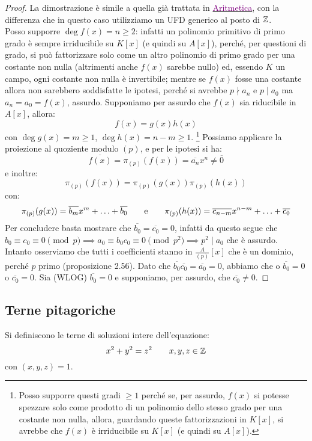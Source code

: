 \documentclass[11pt]{scrartcl}
\begin{document}
\begin{proof}
    La dimostrazione è simile a quella già trattata in \href{https://github.com/diego-unipi/Appunti-Aritmetica}{\textcolor{purple}{Aritmetica}}, 
    con la differenza che in questo caso utilizziamo un UFD generico al posto di $\mathbb Z$. \\
    Posso supporre $\deg f(x) = n \geq 2$: infatti un polinomio primitivo di primo grado è sempre irriducibile su $K[x]$ (e quindi su $A[x]$), 
    perché, per questioni di grado, si può fattorizzare solo come un altro polinomio di primo grado per una costante non nulla (altrimenti anche $f(x)$ sarebbe nullo) ed, essendo $K$ un campo, ogni costante non nulla è invertibile;
    mentre se $f(x)$ fosse una costante allora non sarebbero soddisfatte le ipotesi, perché si avrebbe $p \nmid a_n$ e $p \mid a_0$ ma $a_n = a_0 = f(x)$, assurdo.
    Supponiamo per assurdo che $f(x)$ sia riducibile in $A[x]$, allora:
        \[ f(x) = g(x)h(x)
	    \]
    con $\deg g(x) = m \geq 1$, $\deg h(x) = n-m \geq 1$. 
    \footnote{Posso supporre questi gradi $\geq 1$ perché se, per assurdo, $f(x)$ si potesse spezzare solo come prodotto di un polinomio dello stesso grado per una costante non nulla, allora, guardando queste fattorizzazioni in $K[x]$, si avrebbe che $f(x)$ è irriducibile su $K[x]$ (e quindi su $A[x]$).}
    Possiamo applicare la proiezione al quoziente modulo $(p)$, e per le ipotesi si ha:
        \[ \overline{f(x)} = \pi_{(p)}(f(x)) = \overline{a_n}x^n \ne \overline 0
	    \] 
    e inoltre:
	\[ \pi_{(p)}(f(x)) =  \pi_{(p)}(g(x)) \pi_{(p)}(h(x))
	    \]
    con:
	\[ \pi_{(p)}(g(x)) = \overline{b_m}x^m + \ldots + \overline{b_0} 
	   \qquad \text e \qquad 
	   \pi_{(p)}(h(x)) = \overline{c_{n-m}}x^{n-m} + \ldots + \overline{c_0}
	    \]
    Per concludere basta mostrare che $\overline{b_0} = \overline{c_0} = 0$, 
    infatti da questo segue che $b_0 \equiv c_0 \equiv 0 \pmod p \implies a_0 \equiv b_0c_0 \equiv 0 \pmod{p^2} \implies p^2 \mid a_0$ che è assurdo.
    Intanto osserviamo che tutti i coefficienti stanno in $\displaystyle \frac{A}{(p)}[x]$ che è un dominio, perché $p$ primo (proposizione 2.56).
    Dato che $\overline{b_0}\overline{c_0} = \overline{a_0} = 0$, abbiamo che o $\overline{b_0} = 0$ o $\overline{c_0} = 0$.
    Sia (WLOG) $\overline{b_0} = 0$ e supponiamo, per assurdo, che $\overline{c_0} \neq 0$. 
\end{proof}

\newpage
\subsection{Terne pitagoriche}
\begin{definition}
    Si definiscono  le terne di soluzioni intere dell'equazione:
    \[ x^2 + y^2 = z^2 \qquad x,y,z \in \mathbb Z
        \]
    con  $(x,y,z) = 1$.
\end{definition}
\end{document}
